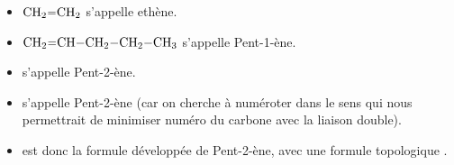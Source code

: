 \documentclass[11pt,a4paper]{article}
\begin{document}
\begin{eg}
\begin{itemize}
    \item $\ce{CH2=CH2}$ s'appelle ethène.
    \item $\ce{CH2=CH-CH2-CH2-CH3}$ s'appelle Pent-1-ène.
    \item {} s'appelle Pent-2-ène.
    \item {} s'appelle Pent-2-ène (car on cherche à numéroter dans le sens qui nous permettrait de minimiser numéro du carbone avec la liaison double).
    \item {} est donc la formule développée de Pent-2-ène, avec une formule topologique \chemfig{
     -[:30]%
    -[:330]%
     =[:30]%
    -[:330]%
}.
\end{itemize}
\end{eg}
\end{document}
